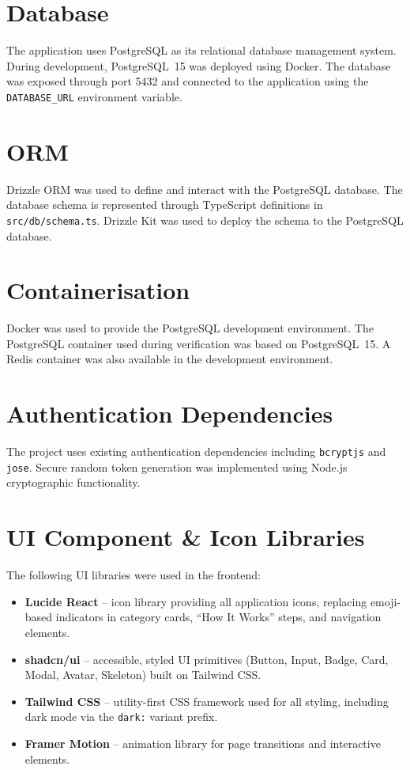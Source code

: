 \documentclass[12pt,a4paper]{report}
\begin{document}
\section{Database}
The application uses PostgreSQL as its relational database management system.
During development, PostgreSQL~15 was deployed using Docker.  The database was
exposed through port 5432 and connected to the application using the
\texttt{DATABASE\_URL} environment variable.

\section{ORM}
Drizzle ORM was used to define and interact with the PostgreSQL database.  The
database schema is represented through TypeScript definitions in
\texttt{src/db/schema.ts}.  Drizzle Kit was used to deploy the schema to the
PostgreSQL database.

\section{Containerisation}
Docker was used to provide the PostgreSQL development environment.  The
PostgreSQL container used during verification was based on PostgreSQL~15.  A
Redis container was also available in the development environment.

\section{Authentication Dependencies}
The project uses existing authentication dependencies including \texttt{bcryptjs}
and \texttt{jose}.  Secure random token generation was implemented using
Node.js cryptographic functionality.

\section{UI Component \& Icon Libraries}
The following UI libraries were used in the frontend:

\begin{itemize}[noitemsep]
  \item \textbf{Lucide React} -- icon library providing all application icons,
        replacing emoji-based indicators in category cards, ``How It Works''
        steps, and navigation elements.
  \item \textbf{shadcn/ui} -- accessible, styled UI primitives (Button, Input,
        Badge, Card, Modal, Avatar, Skeleton) built on Tailwind CSS.
  \item \textbf{Tailwind CSS} -- utility-first CSS framework used for all
        styling, including dark mode via the \texttt{dark:} variant prefix.
  \item \textbf{Framer Motion} -- animation library for page transitions and
        interactive elements.
\end{itemize}
\end{document}
